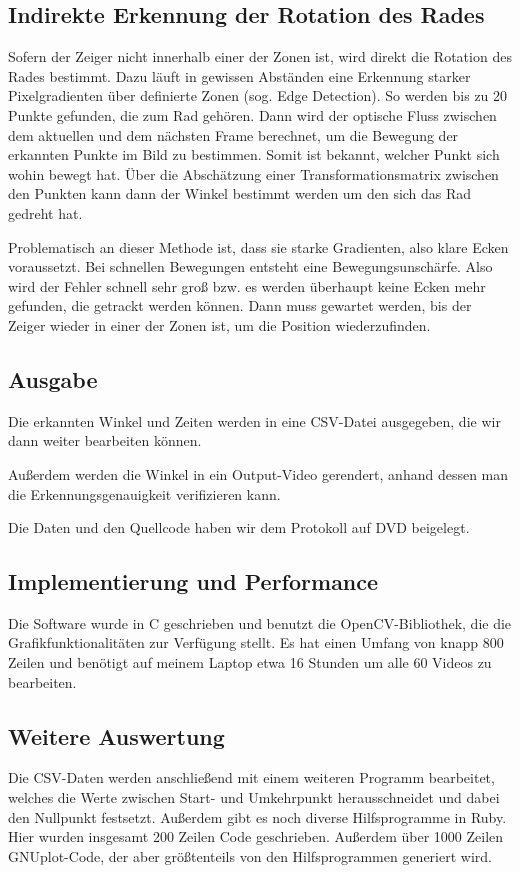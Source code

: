 \documentclass[a4paper,german,12pt,smallheadings]{scrartcl}
\begin{document}
\subsection{Indirekte Erkennung der Rotation des Rades}
Sofern der Zeiger nicht innerhalb einer der Zonen ist, wird direkt die Rotation
des Rades bestimmt. Dazu läuft in gewissen Abständen eine Erkennung starker
Pixelgradienten über definierte Zonen (sog. Edge Detection). So werden bis zu
20 Punkte gefunden, die zum Rad gehören. Dann wird der optische Fluss zwischen
dem aktuellen und dem nächsten Frame berechnet, um die Bewegung der erkannten
Punkte im Bild zu bestimmen. Somit ist bekannt, welcher Punkt sich wohin bewegt
hat. Über die Abschätzung einer Transformationsmatrix zwischen den Punkten kann
dann der Winkel bestimmt werden um den sich das Rad gedreht hat.

Problematisch an dieser Methode ist, dass sie starke Gradienten, also klare
Ecken voraussetzt. Bei schnellen Bewegungen entsteht eine Bewegungsunschärfe.
Also wird der Fehler schnell sehr groß bzw. es werden überhaupt keine Ecken
mehr gefunden, die getrackt werden können. Dann muss gewartet werden, bis der
Zeiger wieder in einer der Zonen ist, um die Position wiederzufinden.

\subsection{Ausgabe}
Die erkannten Winkel und Zeiten werden in eine CSV-Datei ausgegeben, die wir
dann weiter bearbeiten können.

Außerdem werden die Winkel in ein Output-Video gerendert, anhand dessen man die
Erkennungsgenauigkeit verifizieren kann.

Die Daten und den Quellcode haben wir dem Protokoll auf DVD beigelegt.

\subsection{Implementierung und Performance}
Die Software wurde in C geschrieben und benutzt die OpenCV-Bibliothek, die die
Grafikfunktionalitäten zur Verfügung stellt. Es hat einen Umfang von knapp 800
Zeilen und benötigt auf meinem Laptop etwa 16 Stunden um alle 60 Videos zu
bearbeiten.

\subsection{Weitere Auswertung}
Die CSV-Daten werden anschließend mit einem weiteren Programm bearbeitet,
welches die Werte zwischen Start- und Umkehrpunkt herausschneidet und dabei den
Nullpunkt festsetzt. Außerdem gibt es noch diverse Hilfsprogramme in Ruby. Hier
wurden insgesamt 200 Zeilen Code geschrieben. Außerdem über 1000 Zeilen
GNUplot-Code, der aber größtenteils von den Hilfsprogrammen generiert wird.
\end{document}
